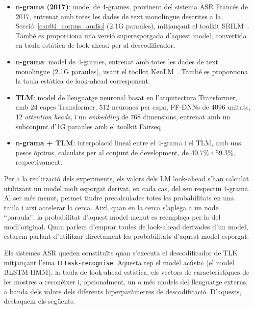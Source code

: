 \begin{itemize}
    \item \textbf{n-grama (2017)}: model de 4-grames, provinent del sistema ASR Francés de 2017, entrenat amb totes les dades de text monolingüe descrites a la Secció~\ref{cap04_corpus_audio} (2.1G paraules), mitjançant el toolkit SRILM~\cite{srilm}. També es proporciona una versió superesporgada d'aquest model, convertida en taula estàtica de look-ahead per al descodificador.
    \item \textbf{n-grama}: model de 4-grames, entrenat amb totes les dades de text monolingüe (2.1G paraules), usant el toolkit KenLM~\cite{kenlm}. També es proporciona la taula estàtica de look-ahead corresponent.
    \item \textbf{TLM}: model de llenguatge neuronal basat en l'arquitectura Transformer, amb 24 capes Transformer, 512 neurones per capa, FF-DNNs de 4096 unitats, 12 \textit{attention heads}, i un \textit{embedding} de 768 dimensions, entrenat amb un subconjunt d'1G paraules amb el toolkit Fairseq~\cite{fairseq}.
    \item \textbf{n-grama + TLM}: interpolació lineal entre el 4-grama i el TLM, amb uns pesos òptims, calculats per al conjunt de development, de 40.7\% i 59.3\%, respectivament.
\end{itemize}

Per a la realització dels experiments, els valors dels LM look-ahead s'han calculat utilitzant un model molt esporgat derivat, en cada cas, del seu respectiu 4-grama. Al ser més menut, permet tindre precalculades totes les probabilitats en una taula i així accelerar la cerca. Així, quan en la cerca s'aplega a un node ``paraula'', la probabilitat d'aquest model menut es reemplaça per la del modl'original. Quan parlem d'emprar taules de look-ahead derivades d'un model, estarem parlant d'utilitzar directament les probabilitats d'aquest model esporgat.

Els sistemes ASR queden constituïts quan s'executa el descodificador de TLK mitjançant l'eina \texttt{tLtask-recognise}. Aquesta rep el model acústic (el model BLSTM-HMM), la taula de look-ahead estàtica, els vectors de característiques de les mostres a reconèixer i, opcionalment, un o més models del llenguatge externs, a banda dels valors dels diferents hiperparàmetres de descodificació.
D'aquests, destaquem els següents:

